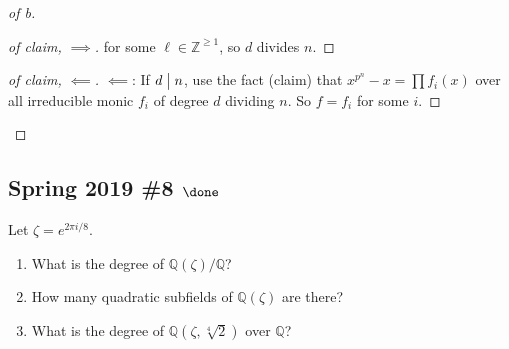 \begin{solution}
\begin{proof}[of b]
\begin{proof}[of claim, $\implies$]
for some \(\ell \in {\mathbb{Z}}^{\geq 1}\), so \(d\) divides \(n\).

\end{proof}

\begin{proof}[of claim, $\impliedby$]

\(\impliedby\): If \(d\bigm|n\), use the fact (claim) that
\(x^{p^n} - x = \prod f_i(x)\) over all irreducible monic \(f_i\) of
degree \(d\) dividing \(n\). So \(f = f_i\) for some \(i\).

\end{proof}

\end{proof}

\end{solution}

\hypertarget{spring-2019-8-done}{%
\subsection{\texorpdfstring{Spring 2019 \#8
\(\done\)}{Spring 2019 \#8 \textbackslash done}}\label{spring-2019-8-done}}

Let \(\zeta = e^{2\pi i/8}\).

\begin{enumerate}
\def\labelenumi{\alph{enumi}.}
\item
  What is the degree of \({\mathbb{Q}}(\zeta)/{\mathbb{Q}}\)?
\item
  How many quadratic subfields of \({\mathbb{Q}}(\zeta)\) are there?
\item
  What is the degree of \({\mathbb{Q}}(\zeta, \sqrt[4] 2)\) over
  \({\mathbb{Q}}\)?
\end{enumerate}

